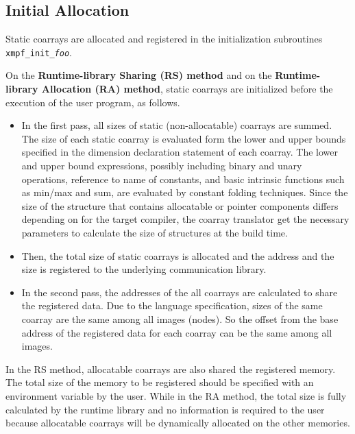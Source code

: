 %
%


\subsection{Initial Allocation}

Static coarrays are allocated and registered in the initialization subroutines 
{\tt xmpf\_init\_{\it foo}}. 

On the {\bf Runtime-library Sharing (RS) method} and 
on the {\bf Runtime-library Allocation (RA) method},
static coarrays are initialized before the execution of the user program,
as follows.
\begin{itemize}
\item
In the first pass, all sizes of static (non-allocatable) coarrays are summed.
The size of each static coarray is evaluated form the lower and upper bounds
specified in the dimension declaration statement of each coarray.
The lower and upper bound expressions, possibly including binary and unary
operations, reference to name of constants, and basic intrinsic functions 
such as min/max and sum, are evaluated by constant folding techniques.
Since the size of the structure that contains allocatable or pointer 
components differs depending on for the target compiler, the coarray translator
get the necessary parameters to calculate the size of structures at the build time.
\item
Then, the total size of static coarrays is allocated and the address
and the size is registered to the underlying communication library.
\item
In the second pass, the addresses of the all coarrays are calculated to share
the registered data.
Due to the language specification, sizes of the same coarray are the same 
among all images (nodes). So the offset from the base address of the registered 
data for each coarray can be the same among all images.
\end{itemize}

In the RS method, allocatable coarrays are also shared the registered memory. 
The total size of the memory to be registered
should be specified with an environment variable by the user.
While in the RA method, the total size is fully calculated by the runtime 
library and no information is required to the user because allocatable coarrays
will be dynamically allocated on the other memories.

